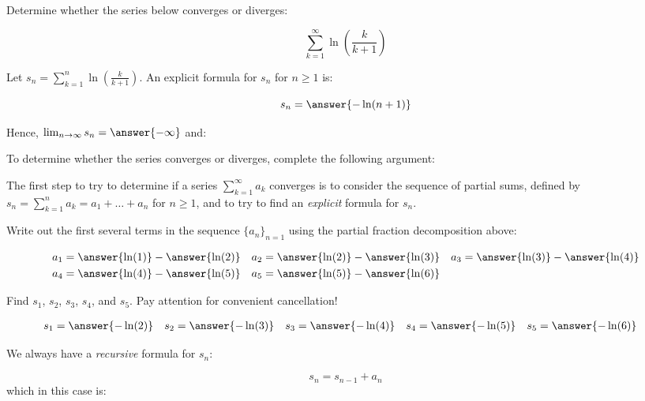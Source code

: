 \documentclass{ximera}
\author{Jim Talamo}
\begin{document}
\begin{exercise}
Determine whether the series below converges or diverges:

\[
\sum_{k=1}^{\infty} \ln \left(\frac{k}{k+1}\right)
\]

Let $s_n = \sum_{k=1}^{n} \ln \left(\frac{k}{k+1}\right)$.  An explicit formula for $s_n$ for $n \geq 1$ is:

\[
s_n = \answer{-\ln(n+1)}
\]

\begin{exercise}
Hence, $\lim_{n \to \infty} s_n = \answer{-\infty}$ and:

\begin{multipleChoice}
\end{multipleChoice}

\begin{hint}
To determine whether the series converges or diverges, complete the following argument:

The first step to try to determine if a series $\sum_{k=1}^{\infty}a_k$ converges is to consider the sequence of partial sums, defined by $s_n = \sum_{k=1}^{n} a_k = a_1+\ldots + a_n$ for $n \geq 1$, and to try to find an \emph{explicit} formula for $s_n$.


Write out the first several terms in the sequence $\{a_n\}_{n=1}$ using the partial fraction decomposition above:

\begin{align*}
a_1 &= \answer{\ln(1)} - \answer{\ln(2)} & a_2 &= \answer{\ln(2)}-\answer{\ln(3)} & a_3 &= \answer{\ln(3)}-\answer{\ln(4)} \\
 a_4 &= \answer{\ln(4)}-\answer{\ln(5)}& a_5 &= \answer{\ln(5)}-\answer{\ln(6)}
\end{align*}

\begin{question}
Find $s_1$, $s_2$, $s_3$, $s_4$, and $s_5$.  Pay attention for convenient cancellation!

\begin{align*}
s_1 &= \answer{-\ln(2)} & s_2 &=  \answer{-\ln(3)} & s_3 &=  \answer{-\ln(4)} & s_4 &= \answer{-\ln(5)}& s_5 &= \answer{-\ln(6)} 
\end{align*}

\begin{question}
We always have a \emph{recursive} formula for $s_n$:

\[
s_n = s_{n-1} +a_n
\]
 which in this case is:
 

\end{question}
\end{question}
\end{hint}
\end{exercise}
\end{exercise}
\end{document}
